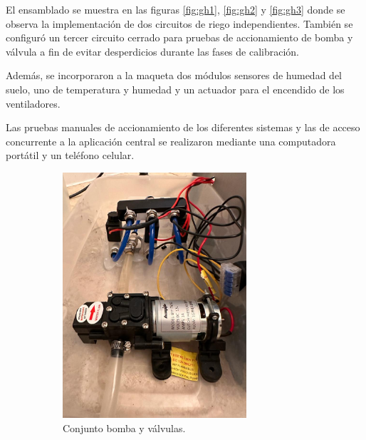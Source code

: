 El ensamblado se muestra en las figuras \ref{fig:gh1}, \ref{fig:gh2} y \ref{fig:gh3} donde se observa la implementación de dos circuitos de riego independientes. También se configuró un tercer circuito cerrado para pruebas de accionamiento de bomba y válvula a fin de evitar desperdicios durante las fases de calibración.



Además, se incorporaron a la maqueta dos módulos sensores de humedad del suelo, uno de temperatura y humedad y un actuador para el encendido de los ventiladores.

Las pruebas manuales de accionamiento de los diferentes sistemas y las de acceso concurrente a la aplicación central se realizaron mediante una computadora portátil y un teléfono celular.

\begin{figure}[htpb]
     \centering
       \begin{subfigure}[b]{0.45\textwidth}
	    \centering
		 \includegraphics[width=0.75\textwidth]{./Figures/chapter4/pump_2.jpg}
		\caption{Conjunto bomba y válvulas.}
		\label{fig:pump}
     \end{subfigure}
          \hfill
     \begin{subfigure}[b]{0.45\textwidth}
		\centering

\end{subfigure}
\end{figure}
